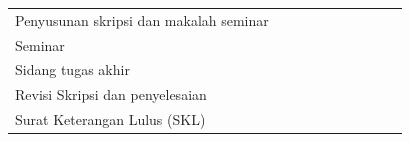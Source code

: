 \begin{table}[h!]
\begin{center}
\begin{tabular}{@{}llllllllll@{}}
		Penyusunan skripsi dan makalah seminar               &                            &                          &                           &                           &                           &                           & \cellcolor[HTML]{000000} & \cellcolor[HTML]{000000} & \cellcolor[HTML]{000000} \\
		Seminar                                              &                            &                          &                           &                           &                           &                           &                          & \cellcolor[HTML]{000000} & \cellcolor[HTML]{000000} \\
		Sidang tugas akhir                                   &                            &                          &                           &                           &                           &                           &                          &                          & \cellcolor[HTML]{000000} \\
		Revisi Skripsi dan penyelesaian                      &                            &                          &                           &                           &                           &                           &                          &                          & \cellcolor[HTML]{000000} \\
		Surat Keterangan Lulus (SKL)                         &                            &                          &                           &                           &                           &                           &                          &                          & \cellcolor[HTML]{000000} \\
		\bottomrule
	\end{tabular}
		\end{center}
\end{table}




